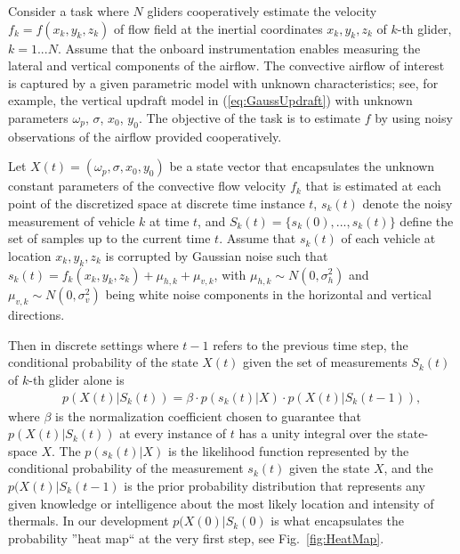 \documentclass{ifacconf}
\begin{document}
Consider a task where $N$ gliders cooperatively estimate the velocity
$f_k=f(x_k,y_k,z_k)$ of flow field at the inertial coordinates $x_k,y_k,z_k$
of $k$-th glider, $k=1...N$. Assume that the onboard instrumentation enables
measuring the lateral and vertical components of the airflow. The convective
airflow of interest is captured by a given parametric model with unknown
characteristics; see, for example, the vertical updraft model in
(\ref{eq:GaussUpdraft}) with unknown parameters $\omega_p$, $\sigma$, $x_0$,
$y_0$. The objective of the task is to estimate $f$ by using noisy
observations of the airflow provided cooperatively.

Let $X(t)=(\omega_p, \sigma, x_0, y_0)$ be a state vector that encapsulates
the unknown constant parameters of the convective flow velocity $f_k$ that is
estimated at each point of the discretized space at discrete time instance
$t$, $s_k(t)$ denote the noisy measurement of vehicle $k$ at time $t$, and
$S_k(t)=\{s_k(0),...,s_k(t)\}$ define the set of samples up to the current
time $t$. Assume that $s_k(t)$ of each vehicle at location $x_k,y_k,z_k$ is
corrupted by Gaussian noise such that
$s_k(t)=f_k(x_k,y_k,z_k)+\mu_{h,k}+\mu_{v,k}$, with $\mu_{h,k}\sim
N(0,\sigma^2_h)$ and $\mu_{v,k}\sim N(0,\sigma^2_v)$ being white noise
components in the horizontal and vertical directions.

Then in discrete settings where $t-1$ refers to the previous time step, the
conditional probability of the state $X(t)$ given the set of measurements
$S_k(t)$ of $k$-th glider alone is
\begin{eqnarray}
    && p(X(t)\vert S_k(t))=\beta \cdot p(s_k(t) \vert X)\cdot p(X(t) \vert S_k(t-1)),
    \label{eq:BayesProb}
\end{eqnarray}
where $\beta$ is the normalization coefficient chosen to guarantee that
$p(X(t)\vert S_k(t))$ at every instance of $t$ has a unity integral over the
state-space $X$.  The $p(s_k(t) \vert X)$ is the likelihood function
represented by the conditional probability of the measurement $s_k(t)$ given
the state $X$, and the $p(X(t) \vert S_k(t-1)$ is the prior probability
distribution that represents any given knowledge or intelligence about the
most likely location and intensity of thermals. In our development $p(X(0)
\vert S_k(0)$ is what encapsulates the probability ''heat map`` at the very
first step, see Fig.~\ref{fig:HeatMap}.
\end{document}
